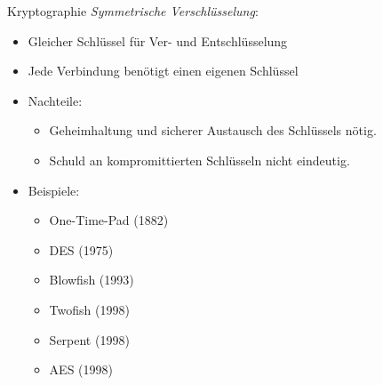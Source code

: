 \begin{bonus}{Kryptographie}
    \emph{Symmetrische Verschlüsselung}:
    \begin{itemize}
        \item Gleicher Schlüssel für Ver- und Entschlüsselung
        \item Jede Verbindung benötigt einen eigenen Schlüssel
        \item Nachteile:
              \begin{itemize}
                  \item Geheimhaltung und sicherer Austausch des Schlüssels nötig.
                  \item Schuld an kompromittierten Schlüsseln nicht eindeutig.
              \end{itemize}
        \item Beispiele:
              \begin{itemize}
                  \item One-Time-Pad (1882)
                  \item DES (1975)
                  \item Blowfish (1993)
                  \item Twofish (1998)
                  \item Serpent (1998)
                  \item AES (1998)
              \end{itemize}
    \end{itemize}


\end{bonus}
